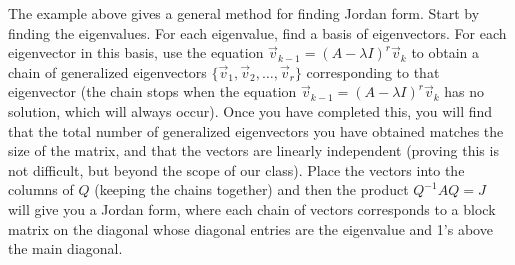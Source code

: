 The example above gives a general method for finding Jordan form. Start by finding the eigenvalues. For each eigenvalue, find a basis of eigenvectors.  For each eigenvector in this basis, use the equation $\vec v_{k-1}=(A-\lambda I)^r\vec v_k$ to obtain a chain of generalized eigenvectors $\{\vec v_1,\vec v_2, \ldots, \vec v_r\}$ corresponding to that eigenvector (the chain stops when the equation $\vec v_{k-1}=(A-\lambda I)^r\vec v_k$ has no solution, which will always occur). Once you have completed this, you will find that the total number of generalized eigenvectors you have obtained matches the size of the matrix, and that the vectors are linearly independent (proving this is not difficult, but beyond the scope of our class). Place the vectors into the columns of $Q$ (keeping the chains together) and then the product $Q^{-1}AQ=J$ will give you a Jordan form, where each chain of vectors corresponds to a block matrix on the diagonal whose diagonal entries are the eigenvalue and 1's above the main diagonal.

